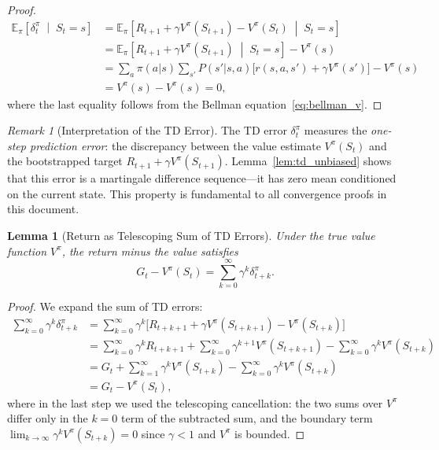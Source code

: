 \documentclass[11pt,a4paper]{article}
\theoremstyle{definition}
\theoremstyle{plain}
\newtheorem{lemma}[theorem]{Lemma}
\theoremstyle{remark}
\newtheorem{remark}{Remark}[section]
\newcommand{\E}{\mathbb{E}}
\begin{document}
\begin{proof}
\begin{align}
    \E_\pi\!\left[\delta_t^\pi \;\middle|\; S_t = s\right]
    &= \E_\pi\!\left[R_{t+1} + \gamma V^\pi(S_{t+1}) - V^\pi(S_t) \;\middle|\; S_t = s\right] \nonumber\\
    &= \E_\pi\!\left[R_{t+1} + \gamma V^\pi(S_{t+1}) \;\middle|\; S_t = s\right] - V^\pi(s) \nonumber\\
    &= \sum_{a} \pi(a|s) \sum_{s'} P(s'|s,a)\bigl[r(s,a,s') + \gamma V^\pi(s')\bigr] - V^\pi(s) \nonumber\\
    &= V^\pi(s) - V^\pi(s) = 0, \label{eq:td_unbiased_proof}
\end{align}
where the last equality follows from the Bellman equation~\eqref{eq:bellman_v}.
\end{proof}

\begin{remark}[Interpretation of the TD Error]
\label{rem:td_interpretation}
The TD error $\delta_t^\pi$ measures the \emph{one-step prediction error}: the discrepancy between the value estimate $V^\pi(S_t)$ and the bootstrapped target $R_{t+1} + \gamma V^\pi(S_{t+1})$. Lemma~\ref{lem:td_unbiased} shows that this error is a martingale difference sequence---it has zero mean conditioned on the current state. This property is fundamental to all convergence proofs in this document.
\end{remark}

\begin{lemma}[Return as Telescoping Sum of TD Errors]
\label{lem:return_td_errors}
Under the true value function $V^\pi$, the return minus the value satisfies
\begin{equation}
    G_t - V^\pi(S_t) = \sum_{k=0}^{\infty} \gamma^k \delta_{t+k}^\pi.
    \label{eq:return_td_errors}
\end{equation}
\end{lemma}

\begin{proof}
We expand the sum of TD errors:
\begin{align}
    \sum_{k=0}^{\infty} \gamma^k \delta_{t+k}^\pi
    &= \sum_{k=0}^{\infty} \gamma^k \bigl[R_{t+k+1} + \gamma V^\pi(S_{t+k+1}) - V^\pi(S_{t+k})\bigr] \nonumber\\
    &= \sum_{k=0}^{\infty} \gamma^k R_{t+k+1} + \sum_{k=0}^{\infty} \gamma^{k+1} V^\pi(S_{t+k+1}) - \sum_{k=0}^{\infty} \gamma^k V^\pi(S_{t+k}) \nonumber\\
    &= G_t + \sum_{k=1}^{\infty} \gamma^k V^\pi(S_{t+k}) - \sum_{k=0}^{\infty} \gamma^k V^\pi(S_{t+k}) \nonumber\\
    &= G_t - V^\pi(S_t), \label{eq:return_td_telescope}
\end{align}
where in the last step we used the telescoping cancellation: the two sums over $V^\pi$ differ only in the $k=0$ term of the subtracted sum, and the boundary term $\lim_{k\to\infty} \gamma^k V^\pi(S_{t+k}) = 0$ since $\gamma < 1$ and $V^\pi$ is bounded.
\end{proof}
\end{document}
